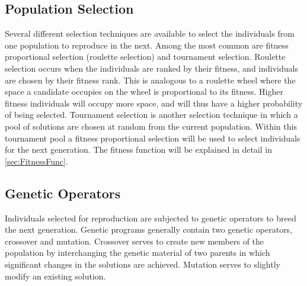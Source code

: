 \subsection{Population Selection}
Several different selection techniques are available to select the individuals from one population to reproduce in the next.
Among the most common are fitness proportional selection (roulette selection) and tournament selection.
Roulette selection occurs when the individuals are ranked by their fitness, and individuals are chosen by their fitness rank.
This is analogous to a roulette wheel where the space a candidate occupies on the wheel is proportional to its fitness.
Higher fitness individuals will occupy more space, and will thus have a higher probability of being selected.
Tournament selection is another selection technique in which a pool of solutions are chosen at random from the current population.
Within this tournament pool a fitness proportional selection will be used to select individuals for the next generation.
The fitness function will be explained in detail in \autoref{sec:FitnessFunc}.

\subsection{Genetic Operators}
Individuals selected for reproduction are subjected to genetic operators to breed the next generation. 
Genetic programs generally contain two genetic operators, crossover and mutation. 
Crossover serves to create new members of the population by interchanging the genetic material of two parents in which significant changes in the solutions are achieved. 
Mutation serves to slightly modify an existing solution. 

